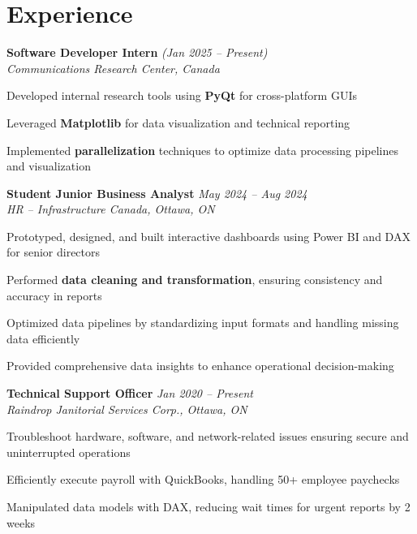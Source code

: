 \documentclass[11pt]{article}
\begin{document}
\section*{Experience}
\begin{small}
\noindent\textbf{Software Developer Intern} \hfill \textit{(Jan 2025 -- Present)} \\
\textit{Communications Research Center, Canada}
\begin{compactitem}
    \item Developed internal research tools using \textbf{PyQt} for cross-platform GUIs
    \item Leveraged \textbf{Matplotlib} for data visualization and technical reporting
    \item Implemented \textbf{parallelization} techniques to optimize data processing pipelines and visualization
\end{compactitem}

\noindent\textbf{Student Junior Business Analyst} \hfill \textit{May 2024 -- Aug 2024} \\
\textit{HR -- Infrastructure Canada, Ottawa, ON}
\begin{compactitem}
    \item Prototyped, designed, and built interactive dashboards using Power BI and DAX for senior directors
    \item Performed \textbf{data cleaning and transformation}, ensuring consistency and accuracy in reports
    \item Optimized data pipelines by standardizing input formats and handling missing data efficiently
    \item Provided comprehensive data insights to enhance operational decision-making
\end{compactitem}

\noindent\textbf{Technical Support Officer} \hfill \textit{Jan 2020 -- Present} \\
\textit{Raindrop Janitorial Services Corp., Ottawa, ON}
\begin{compactitem}
    \item Troubleshoot hardware, software, and network-related issues ensuring secure and uninterrupted operations
    \item Efficiently execute payroll with QuickBooks, handling 50+ employee paychecks
    \item Manipulated data models with DAX, reducing wait times for urgent reports by 2 weeks
\end{compactitem}
\end{small}
\end{document}
